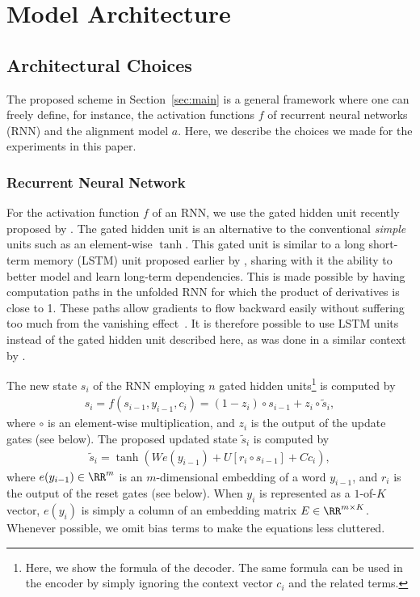 \section{Model Architecture}
\label{sec:model_detail}

\subsection{Architectural Choices}

The proposed scheme in Section~\ref{sec:main} is a general framework where one
can freely define, for instance, the activation functions $f$ of recurrent
neural networks (RNN) and the alignment model $a$. Here, we describe the
choices we made for the experiments in this paper. 

\subsubsection{Recurrent Neural Network}
\label{sec:gatedrnn}

For the activation function $f$ of an RNN, we use the gated hidden unit
recently proposed by \citet{Cho2014}. The gated hidden unit is an alternative
to the conventional {\it simple} units such as an element-wise $\tanh$.  This
gated unit is similar to a long short-term memory (LSTM) unit proposed earlier
by \citet{Hochreiter+Schmidhuber-1997}, sharing with it the ability to better
model and learn long-term dependencies. This is made possible by having
computation paths in the unfolded RNN for which the product of derivatives is
close to 1.  These paths allow gradients to flow backward easily without
suffering too much from the vanishing
effect~\citep{Hochreiter91,Bengio-trnn93,Pascanu+al-ICML2013-small}. It is
therefore possible to use LSTM units instead of the gated hidden unit described
here, as was done in a similar context by \citet{Sutskever2014}.

The new state $s_i$ of the RNN employing $n$ gated hidden units\footnote{
    Here, we show the formula of the decoder. The same formula can be used in
    the encoder by simply ignoring the context vector $c_i$ and the related
    terms.
}
is computed by
\begin{align*}
    s_i = f(s_{i-1}, y_{i-1}, c_i) = (1 - z_i) \circ s_{i-1} + z_i \circ \tilde{s}_{i},
\end{align*}
where $\circ$ is an element-wise multiplication, and $z_i$ is the output of the
update gates (see below). The proposed updated state $\tilde{s}_{i}$ is computed
by
\begin{align*}
    \tilde{s}_{i} = \tanh \left( W e(y_{i - 1}) + U \left[ r_i \circ s_{i - 1} \right] +
    C c_i \right),
\end{align*}
where $e(y_{i-1}) \in \RR^{m}$ is an $m$-dimensional embedding of a word
$y_{i-1}$, and $r_i$ is the output of the reset gates (see below).  When $y_i$
is represented as a $1$-of-$K$ vector, $e(y_i)$ is simply a column of an
embedding matrix $E \in \RR^{m \times K}$. Whenever possible, we omit bias terms
to make the equations less cluttered.

